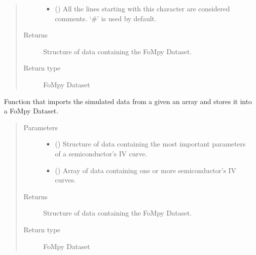 \documentclass[letterpaper,10pt,english,openany, oneside]{sphinxmanual}
\begin{document}
\begin{fulllineitems}
\begin{quote}
\begin{description}
\begin{itemize}
\item {} 
 () \textendash{} All the lines starting with this character are considered comments.
‘\#’ is used by default.

\end{itemize}

\item[{Returns}] \leavevmode
{} \textendash{} Structure of data containing the FoMpy Dataset.

\item[{Return type}] \leavevmode
FoMpy Dataset

\end{description}\end{quote}

\end{fulllineitems}


\begin{fulllineitems}
\label{\detokenize{index:fompy.fds.array}}
Function that imports the simulated data from a given an array and
stores it into a FoMpy Dataset.
\begin{quote}\begin{description}
\item[{Parameters}] \leavevmode\begin{itemize}
\item {} 
 () \textendash{} Structure of data containing the most important parameters of a semiconductor’s IV curve.

\item {} 
 () \textendash{} Array of data containing one or more semiconductor’s IV curves.

\end{itemize}

\item[{Returns}] \leavevmode
{} \textendash{} Structure of data containing the FoMpy Dataset.

\item[{Return type}] \leavevmode
FoMpy Dataset

\end{description}\end{quote}

\end{fulllineitems}
\end{document}

